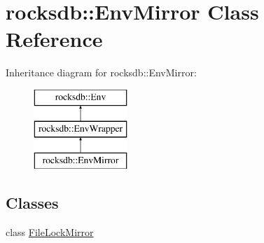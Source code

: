 \hypertarget{classrocksdb_1_1EnvMirror}{}\section{rocksdb\+:\+:Env\+Mirror Class Reference}
\label{classrocksdb_1_1EnvMirror}
Inheritance diagram for rocksdb\+:\+:Env\+Mirror\+:\begin{figure}[H]
\begin{center}
\leavevmode
\includegraphics[height=3.000000cm]{classrocksdb_1_1EnvMirror}
\end{center}
\end{figure}
\subsection*{Classes}
\begin{DoxyCompactItemize}
\item 
class \hyperlink{classrocksdb_1_1EnvMirror_1_1FileLockMirror}{File\+Lock\+Mirror}
\end{DoxyCompactItemize}
